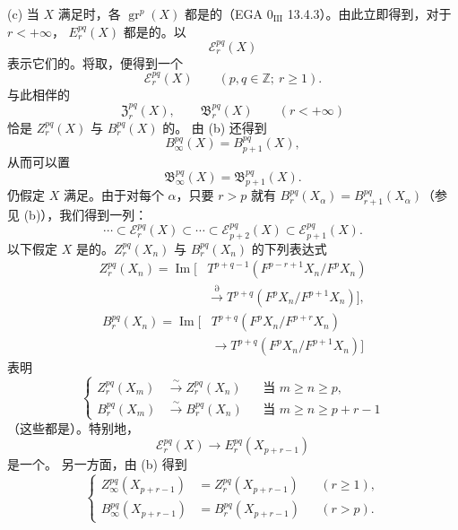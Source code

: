 (c) 当 $X$ 满足时，各 $\operatorname{gr}^p(X)$ 都是的（EGA $0_{\mathrm{III}}$ 13.4.3）。由此立即得到，对于 $r<+\infty$， $E_r^{pq}(X)$ 都是的。以
\[
\mathscr E_r^{pq}(X)
\]
表示它们的。将取，便得到一个
\[
\mathscr E_r^{pq}(X)\qquad(p,q\in\mathbb Z;\ r\geq1).
\]
与此相伴的
\[
\mathfrak Z_r^{pq}(X),\qquad\mathfrak B_r^{pq}(X)\qquad(r<+\infty)
\]
恰是 $Z_r^{pq}(X)$ 与 $B_r^{pq}(X)$ 的。
由 (b) 还得到
\[
B_\infty^{pq}(X)=B_{p+1}^{pq}(X),
\]
从而可以置
\[
\mathfrak B_\infty^{pq}(X)=\mathfrak B_{p+1}^{pq}(X).
\]
仍假定 $X$ 满足。由于对每个 $\alpha$，只要 $r>p$ 就有 $B_r^{pq}(X_\alpha)=B_{r+1}^{pq}(X_\alpha)$（参见 (b)），我们得到一列：
\[
\cdots\subset\mathscr E_r^{pq}(X)\subset\cdots\subset\mathscr E_{p+2}^{pq}(X)\subset\mathscr E_{p+1}^{pq}(X).
\tag{S}
\]
以下假定 $X$ 是的。$Z_r^{pq}(X_n)$ 与 $B_r^{pq}(X_n)$ 的下列表达式
\[
\begin{split}
Z_r^{pq}(X_n)=\operatorname{Im}\bigl[&T^{p+q-1}(F^{p-r+1}X_n/F^pX_n)\\
&\xrightarrow{\partial}T^{p+q}(F^pX_n/F^{p+1}X_n)\bigr],
\end{split}
\]
\[
\begin{split}
B_r^{pq}(X_n)=\operatorname{Im}\bigl[&T^{p+q}(F^pX_n/F^{p+r}X_n)\\
&\longrightarrow T^{p+q}(F^pX_n/F^{p+1}X_n)\bigr]
\end{split}
\]
表明
\[
\left\{\begin{aligned}
Z_r^{pq}(X_m)&\xrightarrow{\sim}Z_r^{pq}(X_n)&&\text{当 }m\geq n\geq p,\\
B_r^{pq}(X_m)&\xrightarrow{\sim}B_r^{pq}(X_n)&&\text{当 }m\geq n\geq p+r-1
\end{aligned}\right.
\tag{$d_1$}
\]
（这些都是）。特别地，
\[
\mathscr E_r^{pq}(X)\longrightarrow E_r^{pq}(X_{p+r-1})
\]
是一个。
另一方面，由 (b) 得到
\[
\left\{\begin{aligned}
Z_\infty^{pq}(X_{p+r-1})&=Z_r^{pq}(X_{p+r-1})&&(r\geq1),\\
B_\infty^{pq}(X_{p+r-1})&=B_r^{pq}(X_{p+r-1})&&(r>p).
\end{aligned}\right.
\tag{$d_2$}
\]
